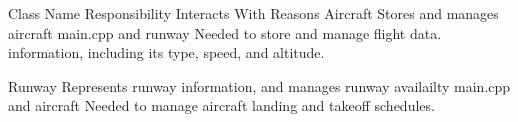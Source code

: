 Class Name         Responsibility                               Interacts With                Reasons
Aircraft         Stores and manages aircraft                    main.cpp and runway          Needed to store and manage flight data. 
                 information, including its type,
                 speed, and altitude. 

Runway           Represents runway information, 
                 and manages runway availailty                  main.cpp and aircraft         Needed to manage aircraft landing 
                                                                                              and takeoff schedules.